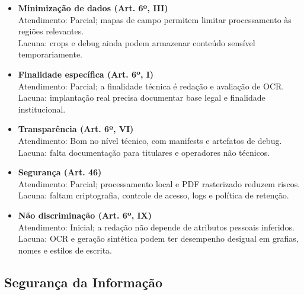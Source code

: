 \documentclass[12pt,a4paper]{article}
\begin{document}
\begin{itemize}
    \item \textbf{Minimização de dados (Art. 6º, III)} \\
    Atendimento: Parcial; mapas de campo permitem limitar processamento às regiões relevantes. \\
    Lacuna: crops e debug ainda podem armazenar conteúdo sensível temporariamente.

    \item \textbf{Finalidade específica (Art. 6º, I)} \\
    Atendimento: Parcial; a finalidade técnica é redação e avaliação de OCR. \\
    Lacuna: implantação real precisa documentar base legal e finalidade institucional.

    \item \textbf{Transparência (Art. 6º, VI)} \\
    Atendimento: Bom no nível técnico, com manifests e artefatos de debug. \\
    Lacuna: falta documentação para titulares e operadores não técnicos.

    \item \textbf{Segurança (Art. 46)} \\
    Atendimento: Parcial; processamento local e PDF rasterizado reduzem riscos. \\
    Lacuna: faltam criptografia, controle de acesso, logs e política de retenção.

    \item \textbf{Não discriminação (Art. 6º, IX)} \\
    Atendimento: Inicial; a redação não depende de atributos pessoais inferidos. \\
    Lacuna: OCR e geração sintética podem ter desempenho desigual em grafias, nomes e estilos de escrita.
\end{itemize}

\subsection{Segurança da Informação}
\end{document}
